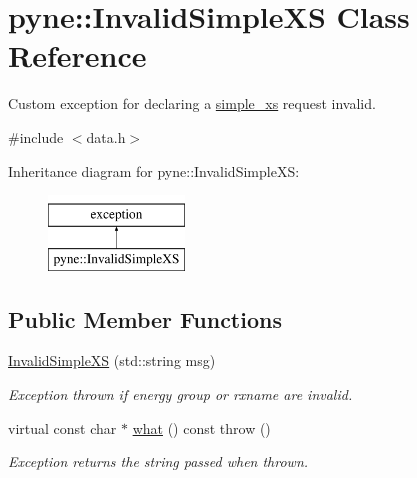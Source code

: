 \hypertarget{classpyne_1_1_invalid_simple_x_s}{}\section{pyne\+:\+:Invalid\+Simple\+XS Class Reference}
\label{classpyne_1_1_invalid_simple_x_s}


Custom exception for declaring a \hyperlink{structsimple__xs}{simple\+\_\+xs} request invalid.  




{\ttfamily \#include $<$data.\+h$>$}

Inheritance diagram for pyne\+:\+:Invalid\+Simple\+XS\+:\begin{figure}[H]
\begin{center}
\leavevmode
\includegraphics[height=2.000000cm]{classpyne_1_1_invalid_simple_x_s}
\end{center}
\end{figure}
\subsection*{Public Member Functions}
\begin{DoxyCompactItemize}
\item 
\mbox{\label{classpyne_1_1_invalid_simple_x_s_ad3bac5f587ea476c11a622024914d074}} 
\hyperlink{classpyne_1_1_invalid_simple_x_s_ad3bac5f587ea476c11a622024914d074}{Invalid\+Simple\+XS} (std\+::string msg)
\begin{DoxyCompactList}\small\item\em Exception thrown if energy group or rxname are invalid. \end{DoxyCompactList}\item 
\mbox{\label{classpyne_1_1_invalid_simple_x_s_a3812e69478a7d6420b21b6add7f9af44}} 
virtual const char $\ast$ \hyperlink{classpyne_1_1_invalid_simple_x_s_a3812e69478a7d6420b21b6add7f9af44}{what} () const  throw ()
\begin{DoxyCompactList}\small\item\em Exception returns the string passed when thrown. \end{DoxyCompactList}\end{DoxyCompactItemize}



